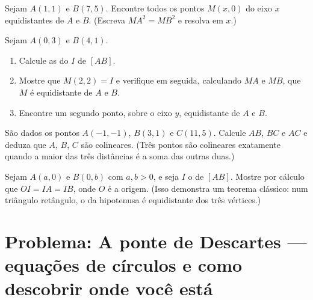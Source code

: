 \begin{exercise}[$\star\star$]\label{exo:g10:coordgeom:7}
Sejam $A(1, 1)$ e $B(7, 5)$. Encontre todos os pontos $M(x, 0)$ do eixo
$x$ equidistantes de $A$ e $B$. (Escreva $MA^2 = MB^2$ e resolva em
$x$.)
\end{exercise}

\begin{exercise}[$\star\star$]\label{exo:g10:coordgeom:8}
Sejam $A(0, 3)$ e $B(4, 1)$.
\begin{enumerate}
  \item Calcule as  do  $I$ de $[AB]$.
  \item Mostre que $M(2, 2) = I$ e verifique em seguida, calculando $MA$
        e $MB$, que $M$ é equidistante de $A$ e $B$.
  \item Encontre um segundo ponto, sobre o eixo $y$, equidistante de $A$
        e $B$.
\end{enumerate}
\end{exercise}

\begin{exercise}[$\star\star$]\label{exo:g10:coordgeom:9}
São dados os pontos $A(-1, -1)$, $B(3, 1)$ e $C(11, 5)$. Calcule $AB$,
$BC$ e $AC$ e deduza que $A$, $B$, $C$ são colineares. (Três pontos são
colineares exatamente quando a maior das três distâncias é a soma das
outras duas.)
\end{exercise}

\begin{exercise}[$\star\star\star$]\label{exo:g10:coordgeom:10}
Sejam $A(a, 0)$ e $B(0, b)$ com $a, b > 0$, e seja $I$ o  de
$[AB]$. Mostre por cálculo que $OI = IA = IB$, onde $O$ é a origem.
(Isso demonstra um teorema clássico: num triângulo retângulo, o  da hipotenusa é equidistante dos três vértices.)
\end{exercise}

\section{Problema: A ponte de Descartes --- equações de círculos e
como descobrir onde você está}

